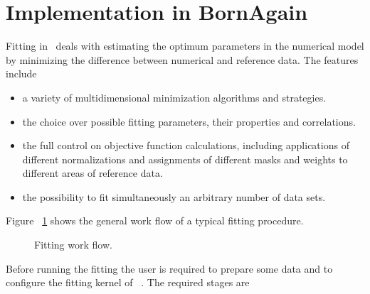 %
\section{Implementation in BornAgain} 

Fitting in  \BornAgain\ deals with estimating the optimum parameters
in the numerical model by minimizing the difference between
numerical and reference data.
The features include 

\begin{itemize}
\item a variety of multidimensional minimization algorithms and strategies.
\item the choice over possible fitting parameters, their properties and correlations.
\item the full control on objective function calculations, including applications of different normalizations and assignments of different masks and weights to different areas of reference data.
\item the possibility to fit simultaneously an arbitrary number of data sets.
\end{itemize}

Figure ~\ref{fig:minimization_workflow} shows the general work flow of a typical fitting procedure.
\begin{figure}[htbp]
\centering
\caption{
Fitting work flow.
}
\label{fig:minimization_workflow}
\end{figure}

Before running the fitting the user is required to prepare some  data and to
configure the fitting kernel of \BornAgain\ . The required stages are

